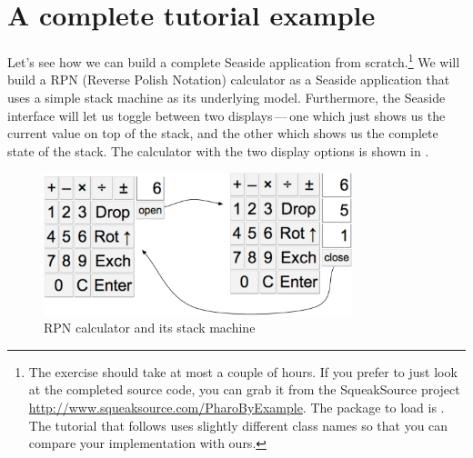 \documentclass[a4paper,10pt,twoside]{book}
\begin{document}

\section{A complete tutorial example}


Let's see how we can build a complete Seaside application from scratch.\footnote{The exercise should take at most a couple of hours. If you prefer to just look at the completed source code, you can grab it from the SqueakSource project \url{http://www.squeaksource.com/PharoByExample}.
The package to load is . The tutorial that follows uses slightly different class names so that you can compare your implementation with ours.}
We will build a RPN (Reverse Polish Notation) calculator as a Seaside application that uses a simple stack machine as its underlying model.
Furthermore, the Seaside interface will let us toggle between two displays\,---\,one which just shows us the current value on top of the stack, and the other which shows us the complete state of the stack.
The calculator with the two display options is shown in .

\begin{figure}[ht]
\begin{center}
\includegraphics[width=0.8\textwidth]{stackMachine}
\caption{RPN calculator and its stack machine}
\label{fig:stackMachine}
\end{center}
\end{figure}
\end{document}
